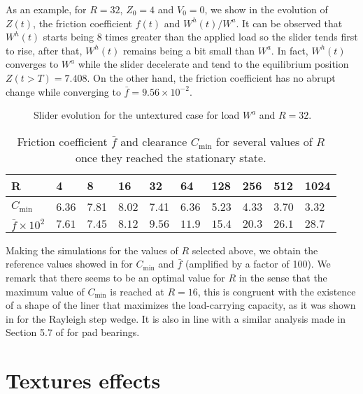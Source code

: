 As an example, for $R=32$, $Z_0=4$ and $V_0=0$, we show in  the evolution of $Z(t)$, the friction coefficient $f(t)$ and $W^h(t)/W^a$. It can be observed that $W^h(t)$ starts being 8 times greater than the applied load so the slider tends first to rise, after that, $W^h(t)$ remains being a bit small than $W^a$. In fact, $W^h(t)$ converges to $W^a$ while the slider decelerate and tend to the equilibrium position $Z(t>T)=7.408$. On the other hand, the friction coefficient has no abrupt change while converging to $\bar{f}=9.56\times 10^{-2}$.

\begin{figure}[ht]
 \centering
 \def\svgwidth{\textwidth}	
 \footnotesize{
}
\caption{Slider evolution for the untextured case for load $W^a$ and $R=32$.}\label{fig:sim1_chap6}
\end{figure}
\begin{table}[ht]
\begin{center}
\begin{tabular}{llllllllll}
\toprule
R & 4 & 8 & 16 & 32 & 64 & 128 & 256 & 512 & 1024 \\
\midrule
$C_\text{min}$& 6.36 & 7.81 & 8.02 & 7.41 & 6.36& 5.23&4.33& 3.70 & 3.32 \\
$\bar{f}\times 10^2$& $7.61$ & $7.45$&  $8.12$ &  $9.56$ &  $11.9$ & $15.4$ & $20.3$ & $26.1$ & $28.7$\\
\bottomrule
\end{tabular}
\end{center}
\caption{Friction coefficient $\bar{f}$ and clearance $C_{\min}$ for
several values of $R$ once they reached the stationary state.}
\label{tab:tableuntext}
\end{table}
Making the simulations for the values of $R$ selected above, we obtain the reference values showed in  for $C_\text{min}$ and $\bar{f}$ (amplified by a factor of 100). We remark that there seems to be an optimal value for $R$ in the sense that the maximum value of $C_\text{min}$ is reached at $R=16$, this is congruent with the existence of a shape of the liner that maximizes the load-carrying capacity, as it was shown in  for the Rayleigh step wedge. It is also in line with a similar analysis made in Section 5.7 of \cite{cameron1971} for pad bearings.

\section{Textures effects}
\label{sec:chap6_textures_effects}


